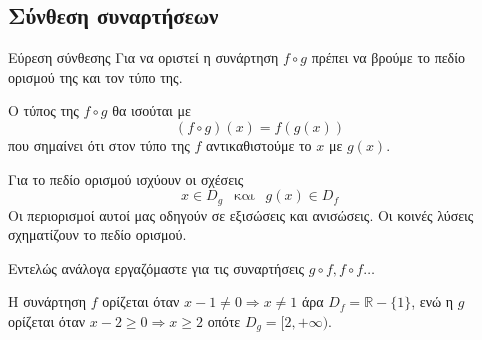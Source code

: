 \subsection{Σύνθεση συναρτήσεων}
\begin{askhsh}{Εύρεση σύνθεσης}
Για να οριστεί η συνάρτηση $ f\circ g $ πρέπει να βρούμε το πεδίο ορισμού της και τον τύπο της.\\
\bhmata
\begin{bhma}
\item Ο τύπος της $ f\circ g $ θα ισούται με
\[ (f\circ g)(x)=f(g(x)) \]
που σημαίνει ότι στον τύπο της $ f $ αντικαθιστούμε το $ x $ με $ g(x) $.
\item Για το πεδίο ορισμού ισχύουν οι σχέσεις
\[ x\in D_g\ \ \textrm{ και }\ \ g(x)\in D_f \]
Οι περιορισμοί αυτοί μας οδηγούν σε εξισώσεις και ανισώσεις. Οι κοινές λύσεις σχηματίζουν το πεδίο ορισμού.
\end{bhma}
Εντελώς ανάλογα εργαζόμαστε για τις συναρτήσεις $ g\circ f, f\circ f\ldots $
\end{askhsh}
\lysh
Η συνάρτηση $f$ ορίζεται όταν $x-1\neq 0\Rightarrow x\neq 1$ άρα $D_f=\mathbb{R}-\{1\}$, ενώ η $g$ ορίζεται όταν $x-2\geq 0\Rightarrow x\geq 2$ οπότε $D_g=[2,+\infty)$.
